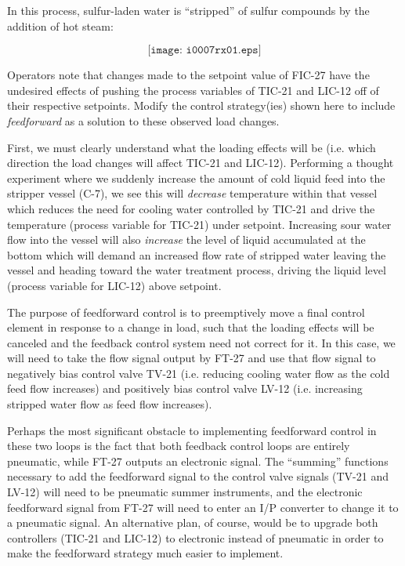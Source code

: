 

In this process, sulfur-laden water is ``stripped'' of sulfur compounds by the addition of hot steam:

$$\texttt{[image: i0007rx01.eps]}$$

Operators note that changes made to the setpoint value of FIC-27 have the undesired effects of pushing the process variables of TIC-21 and LIC-12 off of their respective setpoints.  Modify the control strategy(ies) shown here to include {\it feedforward} as a solution to these observed load changes.







First, we must clearly understand what the loading effects will be (i.e. which direction the load changes will affect TIC-21 and LIC-12).  Performing a thought experiment where we suddenly increase the amount of cold liquid feed into the stripper vessel (C-7), we see this will {\it decrease} temperature within that vessel which reduces the need for cooling water controlled by TIC-21 and drive the temperature (process variable for TIC-21) under setpoint.  Increasing sour water flow into the vessel will also {\it increase} the level of liquid accumulated at the bottom which will demand an increased flow rate of stripped water leaving the vessel and heading toward the water treatment process, driving the liquid level (process variable for LIC-12) above setpoint.

\vskip 10pt

The purpose of feedforward control is to preemptively move a final control element in response to a change in load, such that the loading effects will be canceled and the feedback control system need not correct for it.  In this case, we will need to take the flow signal output by FT-27 and use that flow signal to negatively bias control valve TV-21 (i.e. reducing cooling water flow as the cold feed flow increases) and positively bias control valve LV-12 (i.e. increasing stripped water flow as feed flow increases).

\vskip 10pt

Perhaps the most significant obstacle to implementing feedforward control in these two loops is the fact that both feedback control loops are entirely pneumatic, while FT-27 outputs an electronic signal.  The ``summing'' functions necessary to add the feedforward signal to the control valve signals (TV-21 and LV-12) will need to be pneumatic summer instruments, and the electronic feedforward signal from FT-27 will need to enter an I/P converter to change it to a pneumatic signal.  An alternative plan, of course, would be to upgrade both controllers (TIC-21 and LIC-12) to electronic instead of pneumatic in order to make the feedforward strategy much easier to implement.

